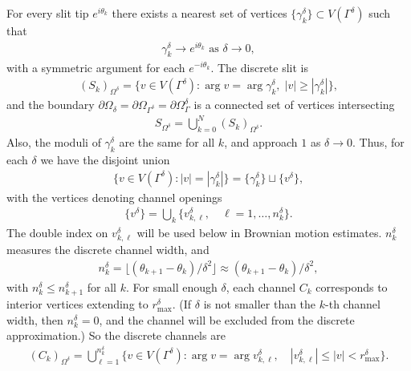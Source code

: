\documentclass[11pt,reqno]{amsart}
\numberwithin{equation}{section}
\begin{document}
For every slit tip $e^{ i \theta_k}$ there exists a nearest set of vertices $\{\gamma_k^{\delta}\} \subset V( \varGamma^{\delta})$ such that
\begin{align}
\gamma_k^{\delta} \to e^{i \theta_k} \text{ as } \delta \to 0,
\end{align}
with a symmetric argument for each $e^{ - i \theta_k}$.
The discrete slit is
\begin{align}
(S_k)_{\Omega^{\delta}} = \{ v \in V(\varGamma^{\delta}) : \arg v = \arg \gamma_k^{\delta},\; |v| \ge |\gamma_k^{\delta}|\},
\end{align}
and the boundary $\partial \Omega_{\delta} = \partial \Omega_{\varGamma^{\delta}} = \partial \Omega_{\varGamma}^{\delta}$ is a connected set of vertices intersecting
\begin{align}
S_{\Omega^{\delta}} = \bigcup_{k=0}^N (S_k)_{\Omega^{\delta}}.
\end{align}
Also, the moduli of $\gamma_k^{\delta}$ are the same for all $k$, and approach $1$ as $\delta \to 0$.
Thus, for each $\delta$ we have the disjoint union
\begin{align}
\{v \in V(\varGamma^{\delta}) : |v| = |\gamma_k^{\delta}| \} = \{\gamma_k^{\delta}\} \sqcup \{v^{\delta} \},
\end{align}
with the vertices denoting channel openings
\begin{align}
 \{v^{\delta} \} = \bigcup_k \{v^{\delta}_{k,\ell}, \quad \ell = 1, \dots, n_k^{\delta} \}.
\end{align}
The double index on $v^{\delta}_{k,\ell}$ will be used below in Brownian motion estimates. $n_k^{\delta}$ measures the discrete channel width, and
\begin{align} \label{eq_discrete_width}
n_k^{\delta} = \lfloor (\theta_{k+1} - \theta_k)/\delta^2 \rfloor \approx (\theta_{k+1} - \theta_k)/\delta^2,
\end{align}
with $n_k^{\delta} \leq n_{k+1}^{\delta}$ for all $k$.
For small enough $\delta$, each channel $C_k$ corresponds to interior vertices extending to $r_{\text{max}}^{\delta}$.
(If $\delta$ is not smaller than the $k$-th channel width, then $n_k^{\delta} = 0$, and the channel will be excluded from the discrete approximation.) So the discrete channels are
\begin{align}
(C_k)_{\Omega^{\delta}} = \bigcup_{\ell = 1}^{n_k^\delta} \{ v \in V(\varGamma^{\delta}) : \arg v = \arg v_{k,\ell}^{\delta}, \quad |v_{k,\ell}^{\delta}| \leq |v| < r^{\delta}_{\text{max}}\}.
\end{align}
\end{document}
